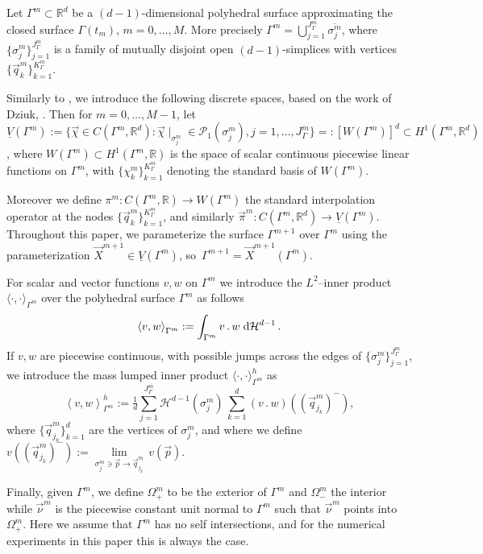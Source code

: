 \documentclass[a4paper,12pt,onecolumn]{article}
\newcommand{\R}{{\mathbb R}}
\newcommand{\dH}[1]{\;{\rm d}{\cal H}^{#1}} %
\newcommand{\Vh}{\underline{V}(\Gamma^m)}
\newcommand{\Wh}{W(\Gamma^m)}
\begin{document}
Let $\Gamma^{m}\subset\R^d$ be a $(d-1)$-dimensional polyhedral surface approximating the closed surface $\Gamma(t_m)$, $m=0 ,\ldots, M$. More precisely $\Gamma^m=\bigcup_{j=1}^{J^m_\Gamma} \overline{\sigma^m_j}$, where $\{\sigma^m_j\}_{j=1}^{J^m_\Gamma}$ is a family of mutually disjoint open $(d-1)$-simplices with vertices $\{\vec{q}^m_k\}_{k=1}^{K^m_\Gamma}$. 

Similarly to \cite{gflows3d}, we introduce the following discrete spaces, based on the work of Dziuk, \cite{Dziuk91}. Then for $m =0 ,\ldots, M-1$, let $\Vh := \{\vec\chi \in C(\Gamma^m,\R^d):\vec\chi\!\mid_{\sigma^m_j} \in \mathcal{P}_1(\sigma^m_j), j=1,\ldots, J^m_\Gamma\} =: [\Wh]^d \subset H^1(\Gamma^m,\R^d)$, where $\Wh \subset H^1(\Gamma^m,\R)$ is the space of scalar continuous piecewise linear functions on $\Gamma^m$, with $\{\chi^m_k\}_{k=1}^{K^m_\Gamma}$ denoting the standard basis of $\Wh$.

Moreover we define $\pi^m: C(\Gamma^m,\R)\to \Wh$ the standard interpolation operator at the nodes $\{\vec{q}_k^m\}_{k=1}^{K^m_\Gamma}$, and similarly $\vec\pi^m: C(\Gamma^m,\R^d)\to \Vh$. Throughout this paper, we parameterize the surface $\Gamma^{m+1}$ over $\Gamma^m$ using the parameterization $\vec{X}^{m+1} \in \Vh$, so\ $\Gamma^{m+1} = \vec{X}^{m+1}(\Gamma^m)$.

For scalar and vector functions $v,w$ on $\Gamma^m$ we introduce the $L^2$--inner product $\langle\cdot,\cdot\rangle_{\Gamma^m}$ over the polyhedral surface $\Gamma^m$ as follows
\begin{equation*}
\left\langle v, w \right\rangle_{\Gamma^m} := \int_{\Gamma^m} v\,.\,w \dH{d-1}\,.
\end{equation*}
If $v,w$ are piecewise continuous, with possible jumps across the edges of $\{\sigma_j^m\}_{j=1}^{J^m_\Gamma}$, we introduce the mass lumped inner product $\langle\cdot,\cdot\rangle_{\Gamma^m}^h$ as
\begin{equation} \label{eq:masslump}
\left\langle v, w \right\rangle^h_{\Gamma^m} := \tfrac1d \sum_{j=1}^{J^m_\Gamma} \mathcal{H}^{d-1}(\sigma^m_j)\,\sum_{k=1}^{d} (v\,.\,w)((\vec{q}^m_{j_k})^-),
\end{equation}
where $\{\vec{q}^m_{j_k}\}_{k=1}^{d}$ are the vertices of $\sigma^m_j$, and where we define $v((\vec{q}^m_{j_k})^-):= \underset{\sigma^m_j\ni \vec{p}\to \vec{q}^m_{j_k}}{\lim}\, v(\vec{p})$.

Finally, given $\Gamma^m$, we define $\Omega^m_+$ to be the exterior of $\Gamma^m$ and $\Omega^m_-$ the interior while $\vec{\nu}^m$ is the piecewise constant unit normal to $\Gamma^m$ such that $\vec\nu^m$ points into $\Omega^m_+$. Here we
assume that $\Gamma^m$ has no self intersections, and for the numerical experiments in this paper this is always the case.
\end{document}
